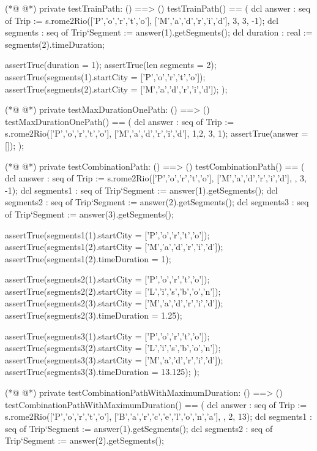 \begin{vdmpp}[breaklines=true]
(*@
\label{testTrainPath:60}
@*)
    private testTrainPath: () ==> ()
    testTrainPath() == (
      dcl answer : seq of Trip := s.rome2Rio(['P','o','r','t','o'], ['M','a','d','r','i','d'], {3}, 3, -1);
     dcl segments : seq of Trip`Segment := answer(1).getSegments();
      dcl duration : real := segments(2).timeDuration;
      
      assertTrue(duration = 1);
      assertTrue(len segments = 2);
      assertTrue(segments(1).startCity = ['P','o','r','t','o']);
      assertTrue(segments(2).startCity = ['M','a','d','r','i','d']);
    );
    
(*@
\label{testMaxDurationOnePath:72}
@*)
    private testMaxDurationOnePath: () ==> ()
    testMaxDurationOnePath() == (
      dcl answer : seq of Trip := s.rome2Rio(['P','o','r','t','o'], ['M','a','d','r','i','d'], {1,2}, 3, 1);
      assertTrue(answer = []);
    );  
    
(*@
\label{testCombinationPath:78}
@*)
    private testCombinationPath: () ==> ()
    testCombinationPath() == (
      dcl answer : seq of Trip := s.rome2Rio(['P','o','r','t','o'], ['M','a','d','r','i','d'], {}, 3, -1);
      dcl segments1 : seq of Trip`Segment := answer(1).getSegments();
      dcl segments2 : seq of Trip`Segment := answer(2).getSegments();
      dcl segments3 : seq of Trip`Segment := answer(3).getSegments();
      
      assertTrue(segments1(1).startCity = ['P','o','r','t','o']);
      assertTrue(segments1(2).startCity = ['M','a','d','r','i','d']);
      assertTrue(segments1(2).timeDuration = 1);
      
      assertTrue(segments2(1).startCity = ['P','o','r','t','o']);
      assertTrue(segments2(2).startCity = ['L','i','s','b','o','n']);
      assertTrue(segments2(3).startCity = ['M','a','d','r','i','d']);
      assertTrue(segments2(3).timeDuration = 1.25);
      
      assertTrue(segments3(1).startCity = ['P','o','r','t','o']);
      assertTrue(segments3(2).startCity = ['L','i','s','b','o','n']);
      assertTrue(segments3(3).startCity = ['M','a','d','r','i','d']);
      assertTrue(segments3(3).timeDuration = 13.125);
    );
    
(*@
\label{testCombinationPathWithMaximumDuration:100}
@*)
    private testCombinationPathWithMaximumDuration: () ==> ()
    testCombinationPathWithMaximumDuration() == (
      dcl answer : seq of Trip := s.rome2Rio(['P','o','r','t','o'], ['B','a','r','c','e','l','o','n','a'], {}, 2, 13);
      dcl segments1 : seq of Trip`Segment := answer(1).getSegments();
      dcl segments2 : seq of Trip`Segment := answer(2).getSegments();
      

\end{vdmpp}
